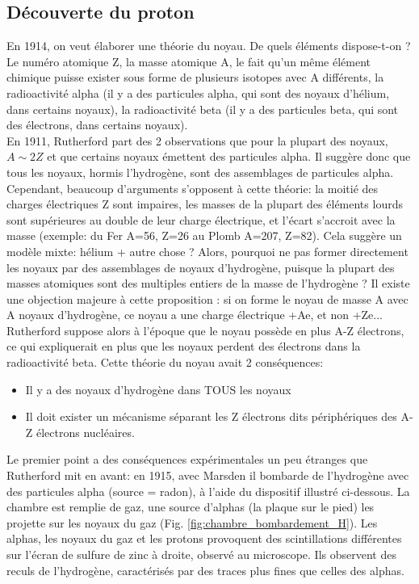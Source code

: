 \subsection{Découverte du proton}
En 1914, on veut élaborer une théorie du noyau. De quels éléments dispose-t-on ? Le numéro atomique Z, la masse atomique A, le fait qu'un même élément chimique puisse exister sous forme de plusieurs isotopes avec A différents, la radioactivité alpha (il y a des particules alpha, qui sont des noyaux d'hélium, dans certains noyaux), la radioactivité beta (il y a des particules beta, qui sont des électrons, dans certains noyaux). \\
En 1911, Rutherford part des 2 observations que pour la plupart des noyaux, $A \sim 2Z$ et que certains noyaux émettent des particules alpha. Il suggère donc que tous les noyaux, hormis l'hydrogène, sont des assemblages de particules alpha. \\
Cependant, beaucoup d'arguments s'opposent à cette théorie: la moitié des charges électriques Z sont impaires, les masses de la plupart des éléments lourds sont supérieures au double de leur charge électrique, et l'écart s'accroit avec la masse (exemple: du Fer A=56, Z=26 au Plomb A=207, Z=82).  Cela suggère un modèle mixte: hélium + autre chose ? Alors, pourquoi ne pas former directement les noyaux par des assemblages de noyaux d'hydrogène, puisque la plupart des masses atomiques sont des multiples entiers de la masse de l'hydrogène ? Il existe une objection majeure à cette proposition : si on forme le noyau de masse A avec A noyaux d'hydrogène, ce noyau a une charge électrique +Ae, et non +Ze... Rutherford suppose alors à l'époque que le noyau possède en plus A-Z électrons, ce qui expliquerait en plus que les noyaux perdent des électrons dans la radioactivité beta. Cette théorie du noyau avait 2 conséquences:

\begin{itemize}
    \item Il y a des noyaux d'hydrogène dans TOUS les noyaux
    \item Il doit exister un mécanisme séparant les Z électrons dits périphériques des A-Z électrons nucléaires.
\end{itemize}

Le premier point a des conséquences expérimentales un peu étranges que Rutherford mit en avant: en 1915, avec Marsden il bombarde de l'hydrogène avec des particules alpha (source = radon), à l'aide du dispositif illustré ci-dessous. La chambre est remplie de gaz, une source d’alphas (la plaque sur le pied) les projette sur les noyaux du gaz (Fig. \ref{fig:chambre_bombardement_H}). Les alphas, les noyaux du gaz et les protons provoquent des scintillations différentes sur l’écran de sulfure de zinc à droite, observé au microscope. Ils observent des reculs de l'hydrogène, caractérisés par des traces plus fines que celles des alphas.

